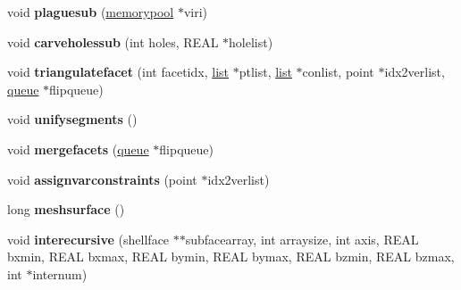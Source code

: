 \begin{DoxyCompactItemize}
\item 
\mbox{\label{classStemMesh3D_1_1tetgenmesh_a4adad1366259d2b812086a406d8ea152}} 
void {\bfseries plaguesub} (\hyperlink{classStemMesh3D_1_1tetgenmesh_1_1memorypool}{memorypool} $\ast$viri)
\item 
\mbox{\label{classStemMesh3D_1_1tetgenmesh_a0e382f13908c90f38810e0c1e2608cb2}} 
void {\bfseries carveholessub} (int holes, R\+E\+AL $\ast$holelist)
\item 
\mbox{\label{classStemMesh3D_1_1tetgenmesh_a7a425768f3be933db6671b30c744fdce}} 
void {\bfseries triangulatefacet} (int facetidx, \hyperlink{classStemMesh3D_1_1tetgenmesh_1_1list}{list} $\ast$ptlist, \hyperlink{classStemMesh3D_1_1tetgenmesh_1_1list}{list} $\ast$conlist, point $\ast$idx2verlist, \hyperlink{classStemMesh3D_1_1tetgenmesh_1_1queue}{queue} $\ast$flipqueue)
\item 
\mbox{\label{classStemMesh3D_1_1tetgenmesh_ab6bdf6e92ca7fc3e23123dee01f93b5b}} 
void {\bfseries unifysegments} ()
\item 
\mbox{\label{classStemMesh3D_1_1tetgenmesh_ac25e1f3070066dc093fa39d5b347deb6}} 
void {\bfseries mergefacets} (\hyperlink{classStemMesh3D_1_1tetgenmesh_1_1queue}{queue} $\ast$flipqueue)
\item 
\mbox{\label{classStemMesh3D_1_1tetgenmesh_a54c251a4f1a25bc7b0dfb0e708aeb526}} 
void {\bfseries assignvarconstraints} (point $\ast$idx2verlist)
\item 
\mbox{\label{classStemMesh3D_1_1tetgenmesh_a07e840def1c5aaa10a7f60ec577b8fcb}} 
long {\bfseries meshsurface} ()
\item 
\mbox{\label{classStemMesh3D_1_1tetgenmesh_a7e6fe1c8e5266dc42ba8ef314ce36ddd}} 
void {\bfseries interecursive} (shellface $\ast$$\ast$subfacearray, int arraysize, int axis, R\+E\+AL bxmin, R\+E\+AL bxmax, R\+E\+AL bymin, R\+E\+AL bymax, R\+E\+AL bzmin, R\+E\+AL bzmax, int $\ast$internum)
\item 
\mbox{\label{classStemMesh3D_1_1tetgenmesh_ab43d89669d0e17b792a410b390227102}} 
$$
\end{DoxyCompactItemize}
